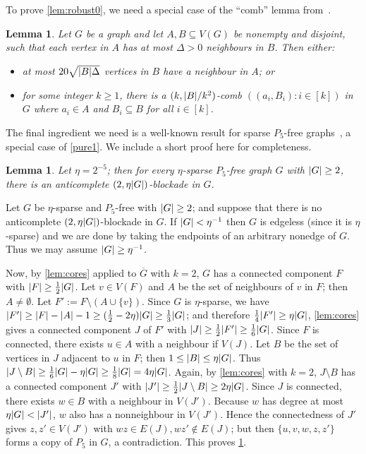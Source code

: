\documentclass[11pt,reqno,a4paper]{amsart}
\newtheorem{lemma}[theorem]{Lemma}
\let\oldendproof\endproof
\renewenvironment{proof}[1][\proofname]{%
	\oldproof[\normalfont\bfseries #1]%
}{\oldendproof}
\newcommand{\dd}{\textquotedblleft}
\newcommand{\ee}{\textquotedblright}
\newcommand{\nin}{\notin}
\renewcommand{\subset}{\subseteq}
\DeclarePairedDelimiter\abs{\lvert}{\rvert}%
\begin{document}
	To prove \cref{lem:robust0}, we need a special case of the \dd comb\ee{} lemma from~\cite{MR4563865}. 
	\begin{lemma}
		\label{lem:combs}
		Let $G$ be a graph and let $A,B\subseteq V(G)$ be nonempty and disjoint, such that
		each vertex in $A$ has at most $\Delta>0$ neighbours in $B$.
		Then either:
		\begin{itemize}
			\item at most $20\sqrt{\abs B\Delta}$ vertices in $B$ have a neighbour in $A$; or
			
			\item
			for some integer $k\ge1$, there is a $(k,\abs B/k^2)$-comb $((a_i,B_i):i\in[k])$ in $G$ where $a_i\in A$ and $B_i\subset B$ for all $i\in[k]$.
		\end{itemize} 
	\end{lemma}
	The final ingredient we need is a well-known result for sparse $P_5$-free graphs~\cite{MR3343757}, a special case of \cref{pure1}.
	We include a short proof here for completeness.
	\begin{lemma}
		\label{lem:sparse}
		Let $\eta=2^{-5}$; then for
		every $\eta$-sparse $P_5$-free graph $G$ with $\abs G\ge2$, there is an anticomplete $(2,{\eta\abs G})$-blockade in $G$.
	\end{lemma}
	\begin{proof}
		Let $G$ be $\eta$-sparse and $P_5$-free with $\abs G\ge2$; and suppose that there is no anticomplete $(2,{\eta\abs G})$-blockade in $G$.
		If $\abs G<\eta^{-1}$ then $G$ is edgeless (since it is $\eta$-sparse) and we are done by taking the endpoints of an arbitrary nonedge of $G$.
		Thus we may assume $\abs G\ge\eta^{-1}$.
		
		Now, by \cref{lem:cores} applied to $\overline G$ with $k=2$, $G$ has a connected component $F$ with $\abs F\ge\frac12\abs G$.
		Let $v\in V(F)$ and $A$ be the set of neighbours of $v$ in $F$; then $A\ne\emptyset$.
		Let $F':=F\setminus(A\cup\{v\})$.
		Since $G$ is $\eta$-sparse, we have $\abs{F'}\ge \abs F-\abs A-1\ge (\frac12-2\eta)\abs G\ge\frac13\abs G$; and therefore $\frac14\abs{F'}\ge \eta\abs G$,
		\cref{lem:cores} gives a connected component $J$ of $F'$ with $\abs J\ge\frac12\abs{F'}\ge\frac16\abs G$.
		Since $F$ is connected, there exists $u\in A$ with a neighbour if $V(J)$.
		Let $B$ be the set of vertices in $J$ adjacent to $u$ in $F$;
		then $1\le\abs B\le \eta\abs G$.
		Thus $\abs{J\setminus B}\ge \frac16\abs G-\eta\abs G\ge\frac18\abs G=4\eta\abs G$.
		Again, by \cref{lem:cores} with $k=2$,
		$J\setminus B$ has a connected component $J'$ with $\abs{J'}\ge\frac12\abs{J\setminus B}\ge 2\eta\abs G$.
		Since $J$ is connected, there exists $w\in B$ with a neighbour in $V(J')$.
		Because $w$ has degree at most $\eta\abs G<\abs{J'}$, $w$ also has a nonneighbour in $V(J')$.
		Hence the connectedness of $J'$ gives $z,z'\in V(J')$ with $wz\in E(J),wz'\nin E(J)$; but then $\{u,v,w,z,z'\}$ forms a copy of $P_5$ in $G$, a contradiction.
		This proves \cref{lem:sparse}.
	\end{proof}
\end{document}
